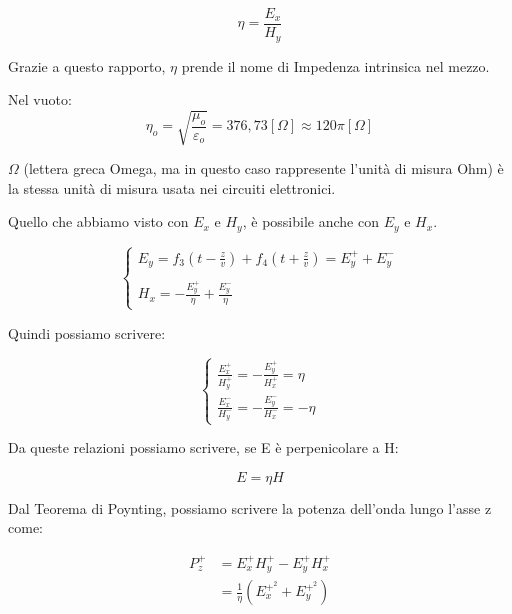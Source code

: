 {\Large \begin{equation}
    \eta = \frac{E_x}{H_y}    
\end{equation}} 

Grazie a questo rapporto, $\eta$ prende il nome di Impedenza intrinsica nel mezzo. 

Nel vuoto: 
{\Large \begin{equation}
    \eta_o = \sqrt{\frac{\mu_o}{\varepsilon_o}} = 376,73 [\Omega] \approx 120 \pi [\Omega]
\end{equation}}

\begin{tcolorbox}
$\Omega$ (lettera greca Omega, ma in questo caso rappresente l'unità di misura Ohm)  è la stessa 
unità di misura usata nei circuiti elettronici. 
    
\end{tcolorbox}

Quello che abbiamo visto con $E_x$ e $H_y$, è possibile anche con $E_y$ e $H_x$. 

{\Large \begin{equation}
    \begin{cases}
        E_y = f_3 (t-\frac{z}{v}) + f_4 (t+\frac{z}{v}) = E_y ^{+} + E_y ^{-} \\ \\
        H_x = - \frac{E_y ^{+}}{\eta} + \frac{E_y ^{-}}{\eta}     
    \end{cases}
\end{equation}} 

Quindi possiamo scrivere: 

{\Large \begin{equation}
    \begin{cases}
        \frac{E_x ^{+}}{H_y ^{+}} = -\frac{E_y ^{+}}{H_x ^{+}} = \eta \\ 
        \frac{E_x ^{-}}{H_y ^{-}} = -\frac{E_y ^{-}}{H_x ^{-}} = - \eta
    \end{cases}
\end{equation}} 

Da queste relazioni possiamo scrivere, se E è perpenicolare a H: 

{\Large \begin{equation}
    E = \eta H
\end{equation}} 




Dal Teorema di Poynting, possiamo scrivere la potenza dell'onda lungo l'asse z come: 

{\Large \begin{equation}
    \begin{split}
        P_z ^{+} 
        &= E_x ^{+} H_y ^{+} - E_y ^{+} H_x ^{+} 
        \\
        &= \frac{1}{\eta} (E_x ^{+^{2}} + E_y ^{+^{2}}) 
    \end{split}
\end{equation}}

